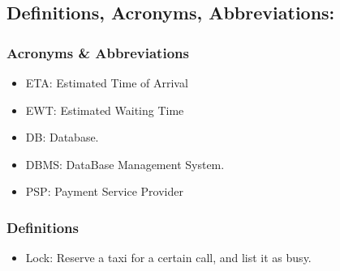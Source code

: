 \subsection{Definitions, Acronyms, Abbreviations: }

\subsubsection{Acronyms \& Abbreviations}
\begin{itemize}
\item ETA: Estimated Time of Arrival
\item EWT: Estimated Waiting Time
\item DB: Database.
\item DBMS: DataBase Management System.
\item PSP: Payment Service Provider
\end{itemize}

\subsubsection{Definitions}
\begin{itemize}
\item Lock: Reserve a taxi for a certain call, and list it as busy.
\end{itemize}

